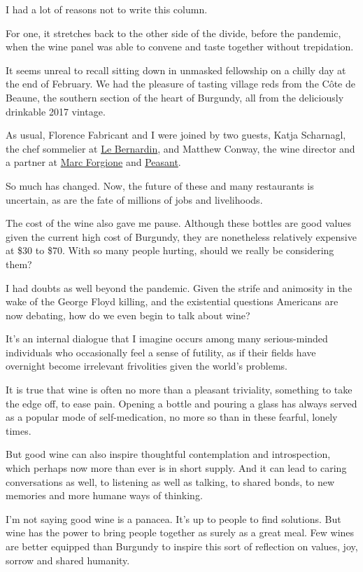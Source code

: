 I had a lot of reasons not to write this column.

For one, it stretches back to the other side of the divide, before the
pandemic, when the wine panel was able to convene and taste together
without trepidation.

It seems unreal to recall sitting down in unmasked fellowship on a
chilly day at the end of February. We had the pleasure of tasting
village reds from the Côte de Beaune, the southern section of the heart
of Burgundy, all from the deliciously drinkable 2017 vintage.

As usual, Florence Fabricant and I were joined by two guests, Katja
Scharnagl, the chef sommelier at \href{https://www.le-bernardin.com/}{Le
Bernardin}, and Matthew Conway, the wine director and a partner at
\href{http://www.marcforgione.com/}{Marc Forgione} and
\href{https://www.peasantnyc.com/}{Peasant}.

So much has changed. Now, the future of these and many restaurants is
uncertain, as are the fate of millions of jobs and livelihoods.

The cost of the wine also gave me pause. Although these bottles are good
values given the current high cost of Burgundy, they are nonetheless
relatively expensive at \$30 to \$70. With so many people hurting,
should we really be considering them?

I had doubts as well beyond the pandemic. Given the strife and animosity
in the wake of the George Floyd killing, and the existential questions
Americans are now debating, how do we even begin to talk about wine?

It's an internal dialogue that I imagine occurs among many
serious-minded individuals who occasionally feel a sense of futility, as
if their fields have overnight become irrelevant frivolities given the
world's problems.

It is true that wine is often no more than a pleasant triviality,
something to take the edge off, to ease pain. Opening a bottle and
pouring a glass has always served as a popular mode of self-medication,
no more so than in these fearful, lonely times.

But good wine can also inspire thoughtful contemplation and
introspection, which perhaps now more than ever is in short supply. And
it can lead to caring conversations as well, to listening as well as
talking, to shared bonds, to new memories and more humane ways of
thinking.

I'm not saying good wine is a panacea. It's up to people to find
solutions. But wine has the power to bring people together as surely as
a great meal. Few wines are better equipped than Burgundy to inspire
this sort of reflection on values, joy, sorrow and shared humanity.

